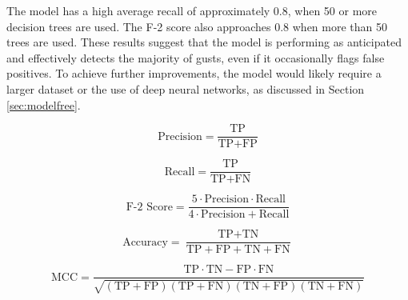 The model has a high average recall of approximately 0.8, when 50 or more decision trees are used. The F-2 score also approaches 0.8 when more than 50 trees are used. These results suggest that the model is performing as anticipated and effectively detects the majority of gusts, even if it occasionally flags false positives. To achieve further improvements, the model would likely require a larger dataset or the use of deep neural networks, as discussed in Section \ref{sec:modelfree}.



\vspace{10mm}


\noindent
\begin{minipage}{0.45\textwidth}
  \begin{equation}
    \text{Precision} = \frac{\text{TP}}{\text{TP} + \text{FP}}
    \label{eq:precision}
  \end{equation}
\end{minipage}
\hfill
\begin{minipage}{0.45\textwidth}
  \begin{equation}
    \text{Recall} = \frac{\text{TP}}{\text{TP} + \text{FN}}
  \end{equation}
\end{minipage}

\vspace{1mm}

\noindent
\begin{minipage}{0.45\textwidth}
  \begin{equation}
    \text{F-2}\text{ Score} = \frac{\text{5} \cdot \text{Precision} \cdot \text{Recall}}{\text{4} \cdot \text{Precision} + \text{Recall}}
  \end{equation}
\end{minipage}
\hfill
\begin{minipage}{0.45\textwidth}
\vspace{7mm}
  \begin{equation}
    \text{Accuracy} = \frac{\text{TP} + \text{TN}}{\text{TP} + \text{FP} + \text{TN} + \text{FN}}
  \end{equation}
\end{minipage}

\vspace{7mm}

\begin{equation}
\text{MCC} = \frac{ \text{TP} \cdot \text{TN} - \text{FP} \cdot \text{FN} }{ \sqrt{ (\text{TP} + \text{FP}) (\text{TP} + \text{FN}) (\text{TN} + \text{FP}) (\text{TN} + \text{FN}) } }
\label{eq:mcc}
\end{equation}









